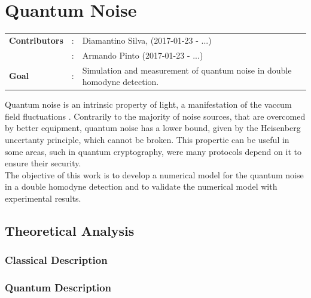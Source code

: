 \clearpage
\section{Quantum Noise}

\begin{tcolorbox}	
\begin{tabular}{p{2.75cm} p{0.2cm} p{10.5cm}}
\textbf{Contributors}  
                       &:& Diamantino Silva, (2017-01-23 - ...)\\
                       &:& Armando Pinto (2017-01-23 - ...)\\
\textbf{Goal}          &:& Simulation and measurement of quantum noise in double homodyne detection.\\
\end{tabular}
\end{tcolorbox}
%
\vspace{2em}
%
%
Quantum noise is an intrinsic property of light, a manifestation of the vaccum field fluctuations
\cite{fox2006}.
Contrarily to the majority of noise sources, that are overcomed by better equipment, quantum noise has a lower bound, given by the Heisenberg uncertanty principle, which cannot be broken. This propertie can be useful in some areas, such in quantum cryptography, were many protocols depend on it to ensure their security.\\
The objective of this work is to develop a numerical model for the quantum noise in a double homodyne detection and to validate the numerical model with experimental results.\\
%
%
\subsection{Theoretical Analysis}
%
\subsubsection{Classical Description}



\subsubsection{Quantum Description}


